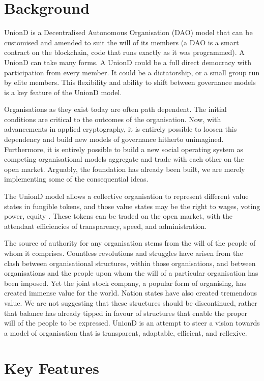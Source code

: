 \documentclass[12pt,twocolumn]{article}
\begin{document}
\section {Background}

UnionD is a Decentralised Autonomous Organisation (DAO) model that can be customised and amended to suit the will of its members (a DAO is a smart contract on the blockchain, code that runs exactly as it was programmed). 
A UnionD can take many forms. A UnionD could be a full direct democracy with participation from every member. It could be a dictatorship, or a small group run by elite members. This flexibility and ability to shift between governance models is a key feature of the UnionD model.

Organisations as they exist today are often path dependent. The initial conditions are critical to the outcomes of the organisation. Now, with advancements in applied cryptography, it is entirely possible to loosen this dependency and build new models of governance hitherto unimagined. Furthermore, it is entirely possible to build a new social operating system as competing organisational models aggregate and trade with each other on the open market. Arguably, the foundation has already been built, we are merely implementing some of the consequential ideas.

The UnionD model allows a collective organisation to represent different value states in fungible tokens, and those value states may be the right to wages, voting power, equity . These tokens can be traded on the open market, with the attendant efficiencies of transparency, speed, and administration.

The source of authority for any organisation stems from the will of the people of whom it comprises. Countless revolutions and struggles have arisen from the clash between organisational structures, within those organisations, and between organisations and the people upon whom the will of a particular organisation has been imposed. Yet the joint stock company, a popular form of organising, has created immense value for the world. Nation states have also created tremendous value. We are not suggesting that these structures should be discontinued, rather that balance has already tipped in favour of structures that enable the proper will of the people to be expressed. UnionD is an attempt to steer a vision towards a model of organisation that is transparent, adaptable, efficient, and reflexive.

\section {Key Features}
\end{document}
